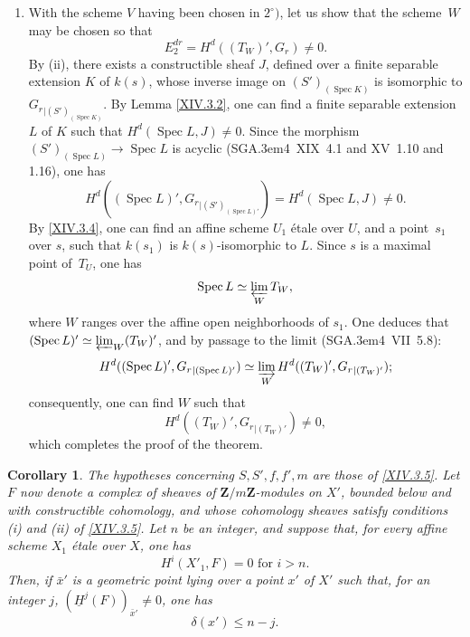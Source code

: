 \documentclass[11pt,a4paper,oneside]{book}
\providecommand{\sisi}[2]{#2}
\providecommand{\pageoriginale}{%
  \refstepcounter{pageoriginal}%
  \marginpar{\raggedright\footnotesize\bfseries\thepageoriginal}%
  \xspace}
\providecommand{\SGA}{\textup{SGA}\kern.3em}
\providecommand{\ZZ}{\mathbf Z}
\providecommand{\Spec}{\operatorname{Spec}}
\let\pageoriginaled\pageoriginale
\theoremstyle{plain}
\newtheorem{corollaire}[subsection]{Corollary}
\theoremstyle{definition}
\theoremstyle{remark}
\renewcommand{\Ref}[1]{\textup{\ref{#1}}}
\begin{document}
\begin{enumerate}
\item[$3^\circ)$]
With the scheme $V$ having been chosen in $2^\circ)$, let us show that the scheme~$W$ may be chosen so that
$$
E^{dr}_2 = H^d((T_W)', G_r) \neq 0.
$$
By \textup{(ii)}, there exists a constructible sheaf $J$, defined over a finite separable extension $K$ of $k(s)$, whose inverse image on $(S')_{(\Spec K)}$ is isomorphic to $\sisi{{G_r}{|(S')_{(\Spec K)}}}{{G_r}_{|(S')_{(\Spec K)}}}$. By Lemma \Ref{XIV.3.2}, one can find a finite separable extension $L$ of $K$ such that $H^d(\Spec L, J) \neq 0$. Since the morphism $(S')_{(\Spec L)} \to \Spec L$ is acyclic (\SGA 4~XIX~4.1 and XV~1.10 and 1.16), one has
$$
H^d((\Spec L)', \sisi{{G_r}{|(S')_{(\Spec L)'}}}{{G_r}_{|(S')_{(\Spec L)'}}}) = H^d(\Spec L, J) \neq 0.
$$
By \Ref{XIV.3.4}, one can find an affine scheme $U_1$ \'{e}tale over $U$, and a point~$s_1$ over $s$, such that $k(s_1)$ is $k(s)$-isomorphic to $L$. Since $s$ is a maximal point of~$T_U$, one has
$$
\Spec L \simeq \varprojlim_W T_W,
$$
where\pageoriginaled $W$ ranges over the affine open neighborhoods of $s_1$. One deduces that $(\Spec L)' \simeq \varprojlim_W(T_W)'$, and by passage to the limit (\SGA 4~VII~5.8):
$$
H^d((\Spec L)', \sisi{{G_r}{|(\Spec L)'}}{{G_r}_{|(\Spec L)'}}) \simeq \varinjlim_W H^d((T_W)', \sisi{{G_r}{|(T_W)'}}{{G_r}_{|(T_W)'}});
$$
consequently, one can find $W$ such that
$$
H^d((T_W)', \sisi{{G_r}{|(T_W)'}}{{G_r}_{|(T_W)'}})\neq 0,
$$
which completes the proof of the theorem.
\end{enumerate}

\begin{corollaire} \label{XIV.3.6}
The hypotheses concerning $S, S', f, f', m$ are those of \Ref{XIV.3.5}. Let $F$ now denote a complex of sheaves of $\ZZ/m\ZZ$-modules on $X'$, bounded below and with constructible cohomology, and whose cohomology sheaves satisfy conditions \textup{(i)} and \textup{(ii)} of \Ref{XIV.3.5}. Let $n$ be an integer, and suppose that, for every affine scheme $X_1$ \'{e}tale over $X$, one has
$$
H^i(X'_1, F)=0\text{ for } i>n.
$$
Then, if $\bar{x}'$ is a geometric point lying over a point $x'$ of $X'$ such that, for an integer $j$, $(\underline{H}^j(F))_{\bar{x}'} \neq 0$, one has
$$
\delta(x')\leq n-j.
$$
\end{corollaire}
\end{document}
